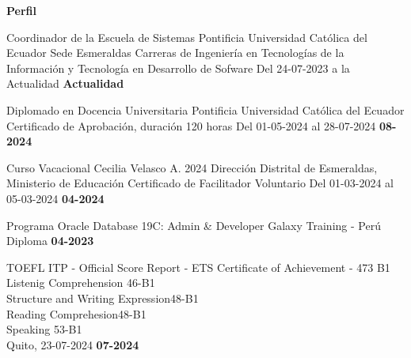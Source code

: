 \newpage
\begin{mainbar}
	\textbf{Perfil}
\end{mainbar}

\setlength{\columnsep}{0.75cm}
\setlength{\columnseprule}{3pt}


\normalsize

\begin{paracol}{2}
\begin{leftcolumn}

\begin{dport}
	\pvevent
	{Coordinador de la Escuela de Sistemas}
	{Pontificia Universidad Católica del Ecuador Sede Esmeraldas}
	{Carreras de Ingeniería en Tecnologías de la Información y Tecnología en Desarrollo de Sofware}
	{Del 24-07-2023 a la Actualidad}
	{\textbf{Actualidad}}
	
\end{dport}

\begin{dport}
	\pvevent
	{Diplomado en Docencia Universitaria}
	{Pontificia Universidad Católica del Ecuador}
	{Certificado de Aprobación, duración 120 horas}
	{Del 01-05-2024 al 28-07-2024}
	{\textbf{08-2024}}
\end{dport}

\begin{lport}
	\pvevent
	{Curso Vacacional Cecilia Velasco A. 2024}
	{Dirección Distrital de Esmeraldas, Ministerio de Educación}
	{Certificado de Facilitador Voluntario}
	{Del 01-03-2024 al 05-03-2024}
	{\textbf{04-2024}}
	
\end{lport}


\begin{dport}
	\pvevent
	{Programa Oracle Database 19C: Admin \& Developer}
	{Galaxy Training - Perú}
	{Diploma}
	{}
	{\textbf{04-2023}}
	
\end{dport}



\end{leftcolumn}

\begin{rightcolumn} 

\begin{dport}
	\pvevent
	{TOEFL ITP - Official Score Report - ETS}
	{Certificate of Achievement - 473 B1}
	{Listenig Comprehension \hspace{1.88cm}46-B1\\
	Structure and Writing Expression\hspace{0.5cm}48-B1\\
	Reading Comprehesion\hspace{2.2cm}48-B1\\
	Speaking \hspace{4.2cm}53-B1\\}
	{Quito, 23-07-2024}
	{\textbf{07-2024}}
\end{dport}


\end{rightcolumn}
\end{paracol}
